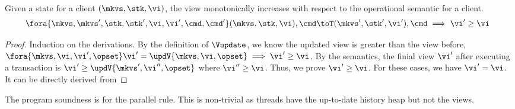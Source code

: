 \begin{lemma}
\label{lem:mono-view}
Given a state for a client \( (\mkvs, \stk, \vi )\), the view monotonically increases with respect to the operational semantic for a client.
\[
    \begin{array}{@{}l}
        \fora{\mkvs, \mkvs', \stk, \stk', \vi, \vi', \cmd, \cmd'} (\mkvs, \stk, \vi), \cmd \toT (\mkvs', \stk', \vi'), \cmd \implies \vi' \geq \vi
    \end{array}
\]
\end{lemma}
\begin{proof}
    Induction on the derivations.
    By the definition of \( \Vupdate \), we know the updated view is greater than the view before, \ie \( \fora{\mkvs, \vi, \vi', \opset} \vi' = \updV{\mkvs, \vi, \opset} \implies \vi' \geq \vi\).
    By the semantics, the finial view \( \vi' \) after executing a transaction is \( \vi' \geq \updV{\mkvs', \vi'', \opset} \) where \( \vi'' \geq \vi\).
    Thus, we prove \( \vi' \geq \vi \).
    For these cases, we have \( \vi' = \vi\).
    It can be directly derived from \ih
\end{proof}






The program soundness is for the parallel rule.
This is non-trivial as threads have the up-to-date history heap but not the views.
\begin{definition}[Judgement]
\[
\]
\end{definition}

